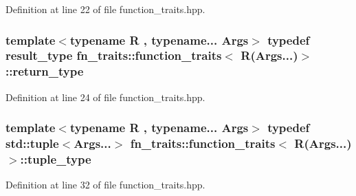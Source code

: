 Definition at line 22 of file function\+\_\+traits.\+hpp.

\subsubsection[{\texorpdfstring{return\+\_\+type}{return_type}}]{\setlength{\rightskip}{0pt plus 5cm}template$<$typename R , typename... Args$>$ typedef {\bf result\+\_\+type} {\bf fn\+\_\+traits\+::function\+\_\+traits}$<$ R(Args...)$>$\+::{\bf return\+\_\+type}\hspace{0.3cm}{\ttfamily [inherited]}}\hypertarget{structfn__traits_1_1function__traits_3_01_r_07_args_8_8_8_08_4_adf6a35a9b703dfb4778e59f132e00a9b}{}\label{structfn__traits_1_1function__traits_3_01_r_07_args_8_8_8_08_4_adf6a35a9b703dfb4778e59f132e00a9b}


Definition at line 24 of file function\+\_\+traits.\+hpp.

\subsubsection[{\texorpdfstring{tuple\+\_\+type}{tuple_type}}]{\setlength{\rightskip}{0pt plus 5cm}template$<$typename R , typename... Args$>$ typedef std\+::tuple$<$Args...$>$ {\bf fn\+\_\+traits\+::function\+\_\+traits}$<$ R(Args...)$>$\+::{\bf tuple\+\_\+type}\hspace{0.3cm}{\ttfamily [inherited]}}\hypertarget{structfn__traits_1_1function__traits_3_01_r_07_args_8_8_8_08_4_a9b60ae8c79e52addf352e4ae7c8077b4}{}\label{structfn__traits_1_1function__traits_3_01_r_07_args_8_8_8_08_4_a9b60ae8c79e52addf352e4ae7c8077b4}


Definition at line 32 of file function\+\_\+traits.\+hpp.



